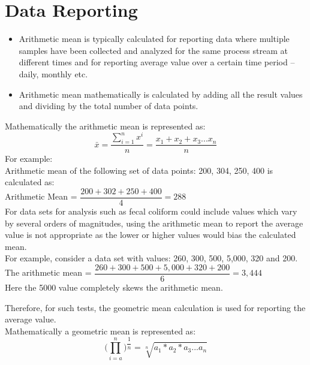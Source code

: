 \section{Data Reporting}	
		\begin{itemize}
			\item Arithmetic mean is typically calculated for reporting data where multiple samples have been collected and analyzed for the same process stream at different times and for reporting average value over a certain time period – daily, monthly etc.\\ \item Arithmetic mean mathematically is calculated by adding all the result values and dividing by the total number of data points.\\
		\end{itemize}
		Mathematically the arithmetic mean is represented as:\\
		$$\bar{x}=\dfrac{\sum_{i=1}^{n} x^i}{n} = \dfrac{x_1+x_2+x_3...x_n}{n}$$
		For example:\\
		Arithmetic mean of the following set of data points:  200, 304, 250, 400 is calculated as:\\
		\vspace{10pt}
		Arithmetic Mean = $\dfrac{200 + 302 + 250 + 400}{4}= 288$\\
		\vspace{10pt}
		For data sets for analysis such as fecal coliform could include values which vary by several orders of magnitudes, using the arithmetic mean to report the average value is not appropriate as the lower or higher values would bias the calculated mean.\\
		\vspace{10pt}
		For example, consider a data set with values:  260, 300, 500, 5,000, 320 and 200.\\
		\vspace{10pt}
		The arithmetic mean = $\dfrac{260+300+500+5,000+320+200}{6} = 3,444$\\
		Here the 5000 value completely skews the arithmetic mean.
		
		Therefore, for such tests, the geometric mean calculation is used for reporting the average value.\\
		
		
		Mathematically a geometric mean is represented as:\\
		$$\Bigg(\prod_{i=a}^n\Bigg)^{\dfrac{1}{n}}=\sqrt[n]{a_1*a_2*a_3...a_n}$$
		 
